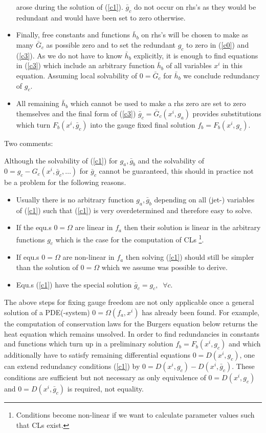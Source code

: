 \begin{itemize}
arose during the solution of (\ref{c1}). $\bar{g}_c$ do not occur on rhs's
as they would be redundant and would have been set to zero otherwise.
\item
Finally, free constants and functions $\bar{h}_b$ on rhs's will be chosen
to make as many $\bar{G}_c$ as possible zero 
and to set the redundant $g_c$ to zero in (\ref{c0}) and (\ref{c3}).
As we do not have to know $\bar{h}_b$ explicitly, it is enough to find
equations in (\ref{c3}) which include an arbitrary function $\bar{h}_b$
of all variables $x^i$ in this equation. Assuming local solvability
of $0 = \bar{G}_c$ for $\bar{h}_b$ we conclude redundancy of $g_c$.
\item 
All remaining $\bar{h}_b$ which cannot be used to make a rhs zero are
set to zero themselves and the final form of (\ref{c3}) 
$\bar{g}_c = \bar{G}_c(x^i,g_a)$ provides substitutions which turn 
$F_b(x^i,\bar{g}_c)$ into the gauge fixed final solution 
$f_b = F_b(x^i,g_c)$.
\end{itemize}
\noindent Two comments: 

Although the solvability of (\ref{c1}) for $g_a,\bar{g}_b$ and the
solvability of $0 = g_c - G_c(x^i,\bar{g}_c,\ldots)$ for $\bar{g}_c$ cannot
be guaranteed, this should in practice not be a problem for the
following reasons.
\begin{itemize}
\item
Usually there is no arbitrary function $g_a,\bar{g}_b$ depending
on all (jet-) variables
of (\ref{c1}) such that (\ref{c1}) is very overdetermined and
therefore easy to solve. 
\item
If the equ.s $0=\Omega$ are linear in $f_a$ then their solution is
linear in the arbitrary functions $g_c$ which is the case for the
computation of CLs \footnote{Conditions become non-linear
if we want to calculate parameter values such that CLs exist.}.
\item
If equ.s $0=\Omega$ are non-linear in $f_a$ then 
solving (\ref{c1}) should still be simpler than the solution of $0=\Omega$
which we assume was possible to derive.
\item
Equ.s (\ref{c1}) have the special 
solution $\bar{g}_c = g_c, \;\;\forall c$.
\end{itemize}


The above steps for fixing gauge freedom are not only 
applicable once a general solution of a PDE(-system) 
$0 = \Omega(f_a,x^i)$ has already been found. For example, the
computation of conservation laws for the Burgers equation below
returns the heat equation which remains unsolved.
In order to find redundancies in constants and functions which 
turn up in a preliminary solution $f_b = F_b(x^i,g_c)$ and 
which additionally have to satisfy remaining differential equations
$0 = D(x^i,g_c)$, one can extend redundancy conditions (\ref{c1})
by $ 0 = D(x^i,g_c) - D(x^i,\bar{g}_c)$. These conditions are sufficient
but not necessary as only equivalence of $0=D(x^i,g_c)$ and 
$0=D(x^i,\bar{g}_c)$ is required, not equality.


